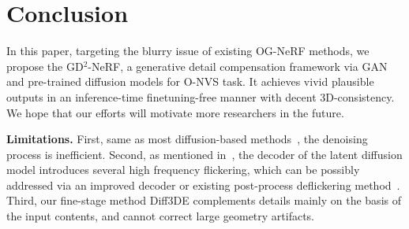

\section{Conclusion}
In this paper, targeting the blurry issue of existing OG-NeRF methods, we propose the GD$^2$-NeRF, a generative detail compensation framework via GAN and pre-trained diffusion models for O-NVS task. It achieves vivid plausible outputs in an inference-time finetuning-free manner with decent 3D-consistency. We hope that our efforts will motivate more researchers in the future. 

\noindent\textbf{Limitations.}  
First, same as most diffusion-based methods~\cite{gu2023nerfdiff,yang2023rerender,geyer2023tokenflow}, the denoising process is inefficient. Second, as mentioned in~\cite{geyer2023tokenflow}, the decoder of the latent diffusion model introduces several high frequency flickering, which can be possibly addressed via an improved decoder or existing post-process deflickering method~\cite{geyer2023tokenflow}. Third, our fine-stage method Diff3DE complements details mainly on the basis of the input contents, and cannot correct large geometry artifacts. 

